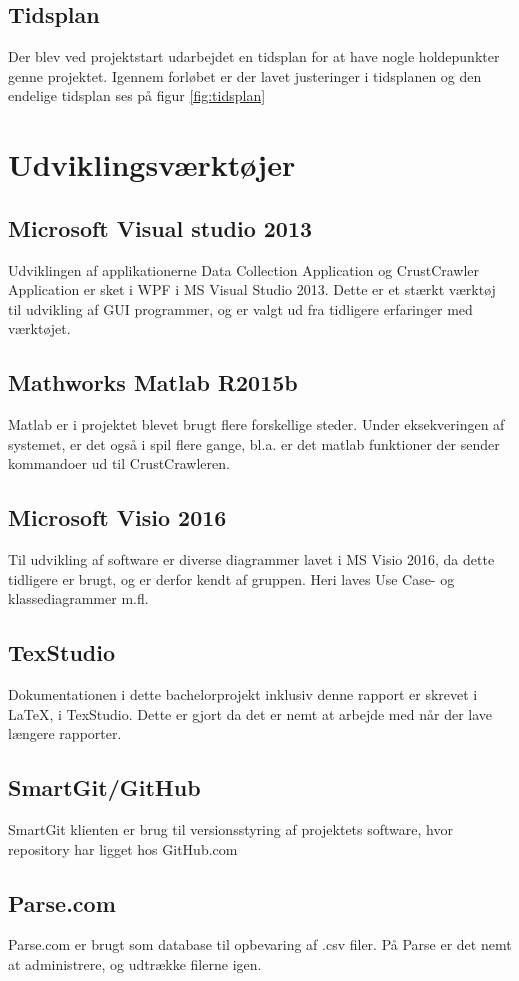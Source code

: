 \subsection{Tidsplan}
\label{sec:tidsplan}
Der blev ved projektstart udarbejdet en tidsplan for at have nogle holdepunkter genne projektet. Igennem forløbet er der lavet justeringer i tidsplanen og den endelige tidsplan ses på figur \ref{fig:tidsplan}


\section{Udviklingsværktøjer}
\label{sec:Udviklingsvaerktojer}

\subsection*{Microsoft Visual studio 2013}
Udviklingen af applikationerne Data Collection Application og CrustCrawler Application er sket i WPF i MS Visual Studio 2013. Dette er et stærkt værktøj til udvikling af GUI programmer, og er valgt ud fra tidligere erfaringer med værktøjet.

\subsection*{Mathworks Matlab R2015b}
Matlab er i projektet blevet brugt flere forskellige steder. Under eksekveringen af systemet, er det også i spil flere gange, bl.a. er det matlab funktioner der sender kommandoer ud til CrustCrawleren.

\subsection*{Microsoft Visio 2016}

Til udvikling af software er diverse diagrammer lavet i MS Visio 2016, da dette tidligere er brugt, og er derfor kendt af gruppen. Heri laves Use Case- og klassediagrammer m.fl.

\subsection*{TexStudio}
Dokumentationen i dette bachelorprojekt inklusiv denne rapport er skrevet i \LaTeX, i TexStudio. Dette er gjort da det er nemt at arbejde med når der lave længere rapporter.

\subsection*{SmartGit/GitHub}
SmartGit klienten\citep{smartgit} er brug til versionsstyring af projektets software, hvor repository har ligget hos GitHub.com\citep{github}

\subsection*{Parse.com}
Parse.com \citep{RefWorks:11} er brugt som database til opbevaring af .csv filer. På Parse er det nemt at administrere, og udtrække filerne igen.